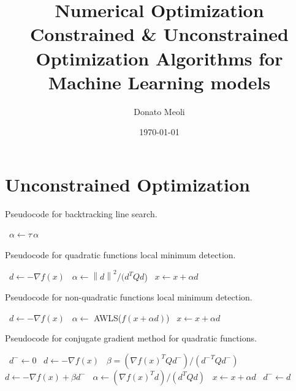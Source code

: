 \documentclass[a4paper]{article}
\title{Numerical Optimization \\ Constrained \& Unconstrained Optimization Algorithms for Machine Learning models}
\author{Donato Meoli}
\date{\today}
\newcommand{\tr}[1]{{#1}^{T}}
\newcommand{\norm}[1]{\left\lVert#1\right\rVert}
\newcommand{\sqrnorm}[1]{{\left\lVert#1\right\rVert}^2}
\begin{document}
\maketitle

\section{Unconstrained Optimization}

\begin{algorithm}
\caption{Pseudocode for backtracking line search.}
\begin{algorithmic}
            \State~$\alpha \gets \tau \, \alpha$ 
        \EndWhile
    \EndProcedure
\end{algorithmic}
\end{algorithm}

\begin{algorithm}
\caption{Pseudocode for quadratic functions local minimum detection.}
\begin{algorithmic}
        \While{($\norm{\nabla f(x)} > \varepsilon$)}
            \State~$d \gets - \nabla f(x)$
            \State~$\alpha \gets \sqrnorm{d} / (\tr{d} Q d$)
            \State~$x \gets x + \alpha d$
        \EndWhile
    \EndProcedure
\end{algorithmic}
\end{algorithm}

\begin{algorithm}
\caption{Pseudocode for non-quadratic functions local minimum detection.}
\begin{algorithmic}
        \While{($\norm{\nabla f(x)} > \varepsilon$)}
            \State~$d \gets - \nabla f(x)$
            \State~$\alpha \gets$ AWLS($f(x + \alpha d)$)
            \State~$x \gets x + \alpha d$
        \EndWhile
    \EndProcedure
\end{algorithmic}
\end{algorithm}

\begin{algorithm}
\caption{Pseudocode for conjugate gradient method for quadratic functions.}
\begin{algorithmic}
        \State~$d^- \gets 0$
            \While{($\norm{\nabla f(x)} > \varepsilon$)}
                    \State~$d \gets - \nabla f(x)$
                \Else
                    \State~$\beta = (\nabla \tr{f(x)} Q d^-) / (\tr{d^-} Q d^-)$
                    \State~$d \gets - \nabla f(x) + \beta d^-$
                \EndIf
                \State~$\alpha \gets (\nabla \tr{f(x)} d) / (\tr{d} Q d)$
                \State~$x \gets x + \alpha d$
                \State~$d^- \gets d$
            \EndWhile
    \EndProcedure
\end{algorithmic}
\end{algorithm}
\end{document}
